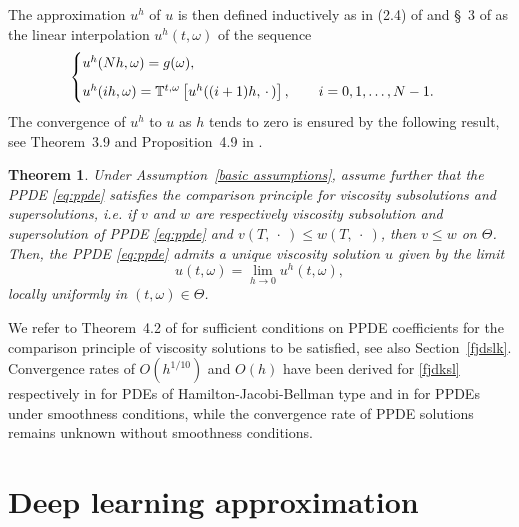 \documentclass[12pt]{article}
\newtheorem{theorem}[prop]{Theorem}
\numberwithin{equation}{section}
\let\oldcitet=\citet
\renewcommand{\cite}[1]{\textcolor[rgb]{0,0,1}{\oldcitet{#1}}}
\renewcommand{\citet}[1]{\textcolor[rgb]{0,0,1}{\oldcitet{#1}}}
\begin{document}
 The approximation $u^h$ of $u$ is then defined
 inductively as in (2.4) of \cite{fahim}
 and \S~3 of \cite{ren2017convergence} as the linear interpolation
 $u^h(t, \omega)$ of the sequence
\begin{equation}\label{eq:probabilistic_scheme}
\begin{cases}
u^h(Nh, \omega) = g(\omega),
\medskip
\\
u^h( ih , \omega) = \mathbb{T}^{t,\omega}\left[u^h((i+1)h, \ \! \cdot \ \! )\right],
\qquad i = 0,1,\ldots , N-1.
\end{cases}
\end{equation}
The convergence of $u^h$ to $u$ as $h$ tends to zero
is ensured by the following result,
see Theorem~3.9 and Proposition~4.9
in \cite{ren2017convergence}.
\begin{theorem}
\label{theo:uh_to_u}
	Under Assumption~\ref{basic assumptions},
	assume further that the PPDE \eqref{eq:ppde}
        satisfies the comparison principle for
        viscosity subsolutions and supersolutions,
	i.e. if $v$ and $w$ are respectively
	viscosity subsolution and supersolution
	of PPDE \eqref{eq:ppde} and
	$v(T, \ \! \cdot \ \! ) \leq w(T, \ \! \cdot \ \! )$,
	then $v \leq w$ on $\Theta$.
	Then, the PPDE \eqref{eq:ppde} admits
	a unique viscosity solution $u$ given by the
        limit
	\begin{equation}
          \label{fjdksl}
	u(t,\omega ) = \lim_{h \rightarrow 0}
        u^h(t,\omega ),
\end{equation}
        locally uniformly in
        $(t,\omega )\in \Theta$.
        \end{theorem}
We refer to Theorem~4.2 of \cite{ren-touzi-zhang} for sufficient conditions
on PPDE coefficients for the
comparison principle of viscosity solutions to be satisfied,
see also Section~\ref{fjdslk}.
\noindent
 Convergence rates of $O(h^{1/10})$ and $O(h)$
 have been derived for \eqref{fjdksl} respectively in \cite{fahim}
 for PDEs of Hamilton-Jacobi-Bellman type
 and in \cite{zhang2014monotone}
 for PPDEs under smoothness conditions,
 while the convergence rate of PPDE solutions
 remains unknown without smoothness conditions.


\section{Deep learning approximation}
\label{sec:deep}
\end{document}
